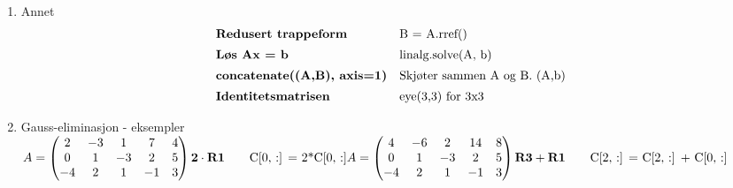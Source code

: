 \documentclass{article}
\newcommand{\vect}[1]{\begin{pmatrix} #1 \end{pmatrix}}
\begin{document}
\begin{enumerate}
    \item Annet \\[1em]
    \begin{equation*}
    \begin{array}{l l}
        \textbf{Redusert trappeform} & \text{B = A.rref()} \\[0.5em]

        \textbf{Løs Ax = b} & \text{linalg.solve(A, b)} \\[0.5em]

        \textbf{concatenate((A,B), axis=1)} & \text{Skjøter sammen A og B. (A,b)} \\[0.5em]

        \textbf{Identitetsmatrisen} & \text{eye(3,3) for 3x3}
        
    \end{array}
    \end{equation*}
    \vspace{1em}

    \item Gauss-eliminasjon - eksempler\\[1em]
    \(A = 
    \vect{2&-3&1&7&4\\
    0&1&-3&2&5\\
    -4&2&1&-1&3}
    \\\\\\
   \mathbf{2\cdot R1} \qquad \text{C[0, :] = 2*C[0, :]}
    \\\\\\
    A = 
    \vect{
    4&-6&2&14&8\\
    0&1&-3&2&5\\
    -4&2&1&-1&3}
    \\\\\\
    \mathbf{R3 + R1} \qquad \text{C[2, :] = C[2, :] + C[0, :]}
    \)
    
\end{enumerate}
\end{document}
